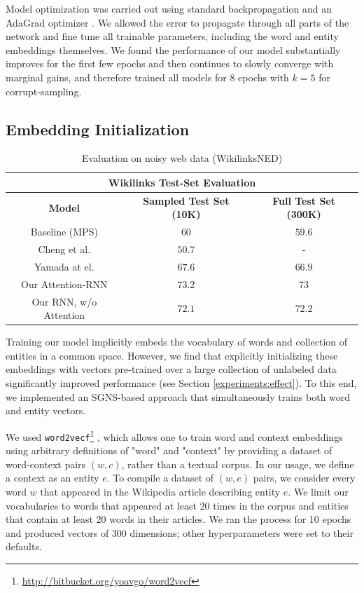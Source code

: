 \documentclass[11pt]{article}
\begin{document}
	Model optimization was carried out using standard backpropagation and an AdaGrad optimizer \cite{duchi2011adaptive}. We allowed the error to propagate through all parts of the network and fine tune all trainable parameters, including the word and entity embeddings themselves. We found the performance of our model substantially improves for the first few epochs and then continues to slowly converge with marginal gains, and therefore trained all models for $8$ epochs with $k=5$ for corrupt-sampling. 
	
	\subsection{Embedding Initialization}
	
	\begin{table}[t]
		\begin{center}
			\begin{tabular}{|c| c | c | }
				\hline \multicolumn{3}{|c|}{Wikilinks Test-Set Evaluation} \\
				\hline \bf Model               & \bf Sampled Test Set (10K)  & \bf Full Test Set (300K)  \\
				\hline Baseline (MPS)                 & $60$   & $59.6$ \\
				Cheng et al.                   & $50.7$ & - \\
				Yamada at el.                  & $67.6$ & $66.9$ \\
				\hline
				Our Attention-RNN              & $73.2$ & $73$ \\
				Our RNN, w/o Attention         & $72.1$   & $72.2$ \\
				\hline
			\end{tabular}
		\end{center}
		\caption{\label{tab:wikilink} Evaluation on noisy web data (WikilinksNED)}
	\end{table}
	
	Training our model implicitly embeds the vocabulary of words and collection of entities in a common space. However, we find that explicitly initializing these embeddings with vectors pre-trained over a large collection of unlabeled data significantly improved performance (see Section \ref{experiments:effect}). To this end, we implemented an SGNS-based approach \cite{mikolov2013distributed} that simultaneously trains both word and entity vectors.
	
	We used \texttt{word2vecf}\footnote{\url{http://bitbucket.org/yoavgo/word2vecf}} \cite{levy2014dependency}, which allows one to train word and context embeddings using arbitrary definitions of "word" and "context" by providing a dataset of word-context pairs $(w,c)$, rather than a textual corpus. In our usage, we define a context as an entity $e$. To compile a dataset of $(w,e)$ pairs, we consider every word $w$ that appeared in the Wikipedia article describing entity $e$. We limit our vocabularies to words that appeared at least 20 times in the corpus and entities that contain at least 20 words in their articles. We ran the process for 10 epochs and produced vectors of 300 dimensions; other hyperparameters were set to their defaults.
	
\end{document}
